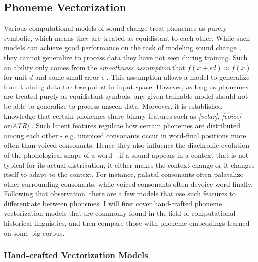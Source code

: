 \documentclass[6pt]{article}
\begin{document}
\subsection{Phoneme Vectorization}
\label{Phoneme Vectorization}
Various computational models of sound change treat phonemes as purely symbolic, which means they are treated as equidistant to each other. While such models can achieve good performance on the task of modeling sound change  \citep{bouchard2007probabilistic,bouchard2013automated}, they cannot generalize to process data they have not seen during training. Such an ability only comes from the \textit{smoothness assumption} that $f(x + \epsilon d) \approx f(x)$ for unit $d$ and some small error $\epsilon$ \citep[p. 555]{Goodfellow-et-al-2016-Book}. This assumption allows a model to generalize from training data to close poinst in input space.  However, as long as phonemes are treated purely as equidistant symbols, any given trainable model should not be able to generalize to process unseen data.
Moreover, it is established knowledge that certain phonemes share binary features such as \textit{[velar]}, \textit{[voice]}  or\textit{[ATR]} \citep{chomsky1968sound}. Such latent features regulate how certain phonemes are distributed among each other - e.g. unvoiced consonants occur in word-final positions more often than voiced consonants. Hence they also influence the diachronic evolution of the phonological shape of a word - if a sound appears in a context that is not typical for its actual distribution, it either makes the context change or it changes itself to adapt to the context. For instance, palatal consonants often palatalize other surrounding consonants, while voiced consonants often devoice word-finally.
Following that observation, there are a few models that use such features to differentiate between phonemes. I will first cover hand-crafted phoneme vectorization models that are commonly found in the field of computational historical linguistics, and then compare those with phoneme embeddings learned on some big corpus.

\subsubsection{Hand-crafted Vectorization Models}
\end{document}
